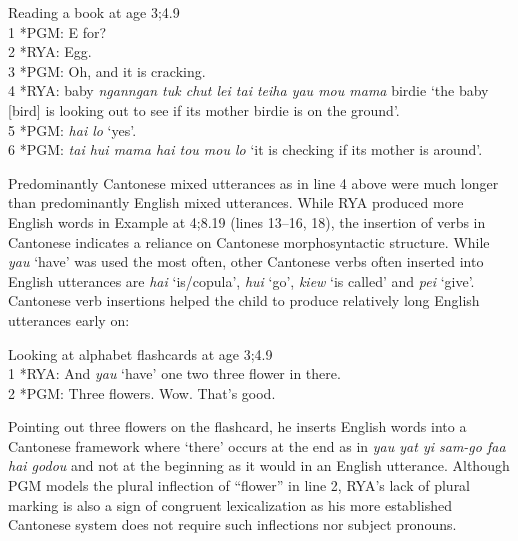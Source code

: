 \documentclass[output=paper,colorlinks,citecolor=brown]{langscibook}
\begin{document}
\ea%
    \label{ex:quay:3}
         Reading a book at age 3;4.9 \\
1 *PGM:  E for?\\
2 *RYA:  Egg.\\
3 *PGM:  Oh, and it is cracking.\\
4 *RYA:  baby \textit{nganngan tuk chut lei tai teiha yau mou mama} birdie ‘the baby [bird] is looking out to see if its mother birdie is on the ground’.\\
5 *PGM:  \textit{hai lo} ‘yes’. \\
6 *PGM:  \textit{tai hui mama hai tou mou lo} ‘it is checking if its mother is around’.

    \z
Predominantly Cantonese mixed utterances as in line 4 above were much longer than predominantly English mixed utterances. While RYA produced more English words in Example  at 4;8.19 (lines 13–16, 18), the insertion of verbs in Cantonese indicates a reliance on Cantonese morphosyntactic structure. While \textit{yau} ‘have’ was used the most often, other Cantonese verbs often inserted into English utterances are \textit{hai} ‘is/copula’, \textit{hui} ‘go’, \textit{kiew} ‘is called’ and \textit{pei} ‘give’. Cantonese verb insertions helped the child to produce relatively long English utterances early on:

\ea%
    \label{ex:quay:4}
         Looking at alphabet flashcards at age 3;4.9\\
1 *RYA:  And \textit{yau} ‘have’ one two three flower in there.\\
2 *PGM:  Three flowers. Wow. That’s good.
    \z

Pointing out three flowers on the flashcard, he inserts English words into a Cantonese framework where ‘there’ occurs at the end as in \textit{yau yat yi sam-go faa hai godou} and not at the beginning as it would in an English utterance. Although PGM models the plural inflection of “flower” in line 2, RYA’s lack of plural marking is also a sign of congruent lexicalization as his more established Cantonese system does not require such inflections nor subject pronouns.  
\end{document}
